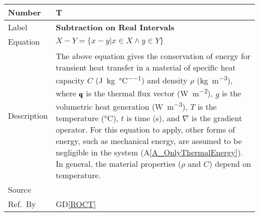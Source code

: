 \documentclass[12pt]{article}
\newcommand{\colAwidth}{0.13\textwidth}
\newcommand{\colBwidth}{0.82\textwidth}
\newcommand{\dref}[1]{GD\ref{#1}}
\newcounter{theorynum} %
\newcommand{\aref}[1]{A\ref{#1}}
\begin{document}
\noindent
\begin{minipage}{\textwidth}
	\renewcommand*{\arraystretch}{1.5}
	\begin{tabular}{| p{\colAwidth} | p{\colBwidth}|}
		\hline
		\rowcolor[gray]{0.9}
		Number& T{theorynum}\thetheorynum \label{T_subtraction}\\
		\hline
		Label&\bf Subtraction on Real Intervals\\
		\hline
		Equation&  $X - Y = \{x - y | x \in X \wedge y \in Y\}$\\
		\hline
		Description & 
		The above equation gives the conservation of energy for transient heat 
		transfer in a material
		of specific heat capacity $C$ (\si{\joule\per\kilogram\per\celsius}) 
		and density $\rho$ 
		(\si{\kilogram\per\cubic\metre}), where $\bf q$ is the thermal flux 
		vector (\si{\watt\per\square\metre}),
		$g$ is the volumetric heat generation
		(\si{\watt\per\cubic\metre}), $T$ is the temperature
		(\si{\celsius}),  $t$ is time (\si{\second}), and $\nabla$ is
		the gradient operator.  For this equation to apply, other forms
		of energy, such as mechanical energy, are assumed to be negligible in 
		the
		system (\aref{A_OnlyThermalEnergy}).  In general, the material 
		properties ($\rho$ and $C$) depend on temperature.\\
		\hline
		Source & \citet{intervalarithmetic}\\
		\hline
		Ref.\ By & \dref{ROCT}\\
		\hline
	\end{tabular}
\end{minipage}\\

~\newline
\end{document}

